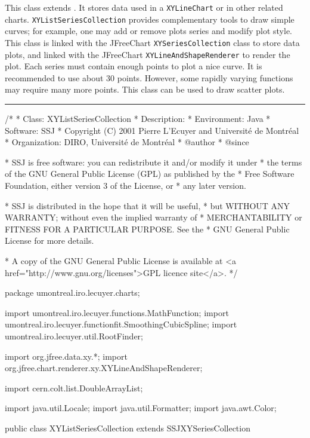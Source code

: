 
This class extends
.
It stores data used in a \texttt{XYLineChart} or in other related charts.
%
\texttt{XYListSeriesCollection} provides complementary tools to draw
 simple curves; for example, one may
add or remove plots series and modify plot style.
This class is linked with the JFreeChart \texttt{XYSeriesCollection} class to
store data plots,
and linked with the JFreeChart \texttt{XYLineAndShapeRenderer} to render the plot.
Each series must contain enough points to plot a nice curve.
It is recommended to use about 30 points. However, some rapidly
varying functions may require many more points. This class can be used to draw scatter plots.

\bigskip\hrule
\begin{code}
\begin{hide}
/*
 * Class:        XYListSeriesCollection
 * Description:  
 * Environment:  Java
 * Software:     SSJ 
 * Copyright (C) 2001  Pierre L'Ecuyer and Université de Montréal
 * Organization: DIRO, Université de Montréal
 * @author       
 * @since

 * SSJ is free software: you can redistribute it and/or modify it under
 * the terms of the GNU General Public License (GPL) as published by the
 * Free Software Foundation, either version 3 of the License, or
 * any later version.

 * SSJ is distributed in the hope that it will be useful,
 * but WITHOUT ANY WARRANTY; without even the implied warranty of
 * MERCHANTABILITY or FITNESS FOR A PARTICULAR PURPOSE.  See the
 * GNU General Public License for more details.

 * A copy of the GNU General Public License is available at
   <a href="http://www.gnu.org/licenses">GPL licence site</a>.
 */
\end{hide}
package umontreal.iro.lecuyer.charts;\begin{hide}

import   umontreal.iro.lecuyer.functions.MathFunction;
import   umontreal.iro.lecuyer.functionfit.SmoothingCubicSpline;
import   umontreal.iro.lecuyer.util.RootFinder;

import   org.jfree.data.xy.*;
import   org.jfree.chart.renderer.xy.XYLineAndShapeRenderer;

import   cern.colt.list.DoubleArrayList;

import   java.util.Locale;
import   java.util.Formatter;
import   java.awt.Color;\end{hide}

public class XYListSeriesCollection  extends SSJXYSeriesCollection \begin{hide} {
   protected String[] marksType;   // marks on points (+, x, *...)
   protected String[] dashPattern; // line dashing (solid, dotted, densely dotted, loosely dotted,
                                 //               dashed, densely dashed, loosely dashed, only marks)
   protected String[] plotStyle;   // plot style (lines, curves...)
   private boolean autoCompletion = false;
\end{hide}
\end{code}

